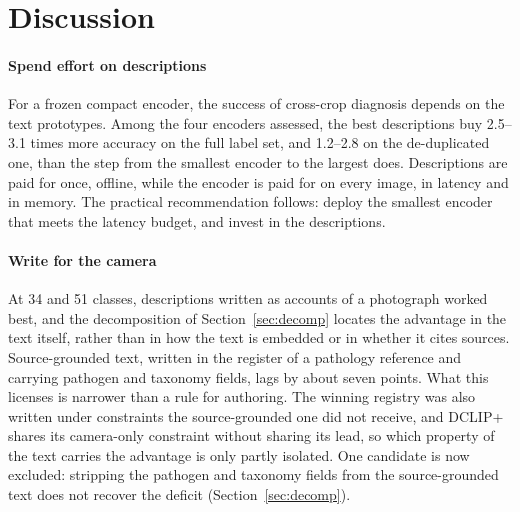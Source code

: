 \documentclass[a4paper,fleqn]{cas-dc}
\begin{document}
\section{Discussion}
\label{sec:discussion}

\paragraph{Spend effort on descriptions} For a frozen compact encoder, the success of cross-crop
diagnosis depends on the text prototypes. Among the four encoders assessed, the best descriptions
buy 2.5--3.1 times more accuracy on the full label set, and 1.2--2.8 on the de-duplicated one, than
the step from the smallest encoder to the largest does. Descriptions are paid for once, offline,
while the encoder is paid for on every image, in latency and in memory. The practical recommendation
follows: deploy the smallest encoder that meets the latency budget, and invest in the descriptions.

\paragraph{Write for the camera} At 34 and 51 classes, descriptions written as accounts of a
photograph worked best, and the decomposition of Section~\ref{sec:decomp} locates the advantage in
the text itself, rather than in how the text is embedded or in whether it cites
sources. Source-grounded text, written in the register of a pathology reference and carrying
pathogen and taxonomy fields, lags by about seven points. What this licenses is narrower than a rule for
authoring. The winning registry was also written under constraints the source-grounded one did not
receive, and DCLIP+ shares its
camera-only constraint without sharing its lead, so which property of the text carries the advantage is only partly isolated. One candidate is now
excluded: stripping the pathogen and taxonomy fields from the source-grounded text does not
recover the deficit (Section~\ref{sec:decomp}).
\end{document}

